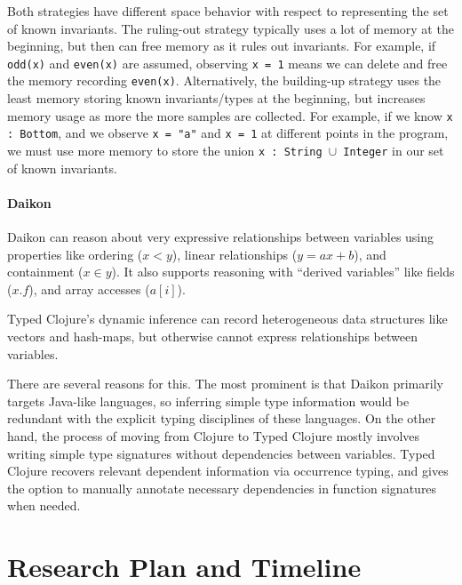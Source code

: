 \documentclass[9pt]{extarticle}
\begin{document}
Both strategies have different space behavior with respect to representing
the set of known invariants.
The ruling-out strategy typically uses a lot of memory at the beginning,
but then can free memory as it rules out invariants. For example, if
\texttt{odd(x)} and \texttt{even(x)} are assumed, observing \texttt{x = 1}
means we can delete and free the memory recording \texttt{even(x)}.
Alternatively, the building-up strategy uses the least memory storing
known invariants/types at the beginning, but increases memory usage
as more the more samples are collected. For example, if we know
\texttt{x : Bottom}, and we observe \texttt{x = "a"} and \texttt{x = 1}
at different points in the program, we must use more memory to
store the union \texttt{x : String $\cup$ Integer} in our set of known invariants.

\paragraph{Daikon}
Daikon can reason about very expressive relationships between variables
using properties like ordering ($x < y$), linear relationships ($y = ax + b$),
and containment ($x \in y$). It also supports reasoning with ``derived variables''
like fields ($x.f$), and array accesses ($a[i]$).

Typed Clojure's dynamic inference can record heterogeneous data structures
like vectors and hash-maps, but otherwise cannot express relationships
between variables.

There are several reasons for this. The most prominent is that Daikon
primarily targets Java-like languages, so inferring simple type information
would be redundant with the explicit typing disciplines of these languages.
On the other hand, the process of moving from Clojure to Typed Clojure
mostly involves writing simple type signatures without dependencies
between variables. Typed Clojure recovers relevant dependent information
via occurrence typing, and gives the option to manually annotate necessary
dependencies in function signatures when needed.


\section{Research Plan and Timeline}
\end{document}
